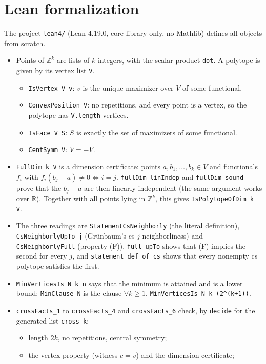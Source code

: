 \documentclass[11pt]{article}
\theoremstyle{definition}
\theoremstyle{remark}
\begin{document}
\section{Lean formalization}
The project \texttt{lean4/} (Lean 4.19.0, core library only, no Mathlib) defines all
objects from scratch.
\begin{itemize}
\item Points of $\mathbb Z^k$ are lists of $k$ integers, with the scalar product \texttt{dot}.
A polytope is given by its vertex list \texttt{V}.
  \begin{itemize}
  \item \texttt{IsVertex V v}: $v$ is the unique maximizer over $V$ of some functional.
  \item \texttt{ConvexPosition V}: no repetitions, and every point is a vertex, so the
  polytope has \texttt{V.length} vertices.
  \item \texttt{IsFace V S}: $S$ is exactly the set of maximizers of some functional.
  \item \texttt{CentSymm V}: $V=-V$.
  \end{itemize}
\item \texttt{FullDim k V} is a dimension certificate: points $a,b_1,\dots,b_k\in V$ and
functionals $f_i$ with $f_i(b_j-a)\ne0\iff i=j$. \texttt{fullDim\_linIndep} and
\texttt{fullDim\_sound} prove that the $b_j-a$ are then linearly independent (the same
argument works over $\mathbb R$). Together with all points lying in $\mathbb Z^k$, this
gives \texttt{IsPolytopeOfDim k V}.
\item The three readings are \texttt{StatementCsNeighborly} (the literal definition),
\texttt{CsNeighborlyUpTo j} (Gr\"unbaum's cs-$j$-neighborliness) and \texttt{CsNeighborlyFull}
(property (F)). \texttt{full\_upTo} shows that (F) implies the second for every $j$, and
\texttt{statement\_def\_of\_cs} shows that every nonempty cs polytope satisfies the first.
\item \texttt{MinVerticesIs N k n} says that the minimum is attained and is a lower bound;
\texttt{MinClause N} is the clause $\forall k\ge1$, \texttt{MinVerticesIs N k (2\^{}(k+1))}.
\item \texttt{crossFacts\_1} to \texttt{crossFacts\_4} and \texttt{crossFacts\_6} check, by \texttt{decide} for the
generated list \texttt{cross k}:
  \begin{itemize}
  \item length $2k$, no repetitions, central symmetry;
  \item the vertex property (witness $c=v$) and the dimension certificate;

\end{itemize}
\end{itemize}
\end{document}
